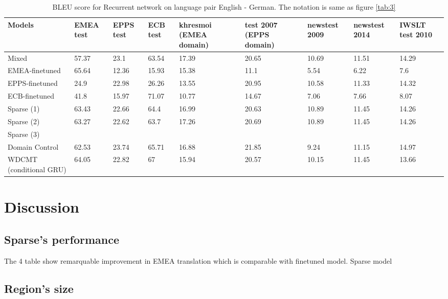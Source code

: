 \documentclass[11pt,a4paper]{article}
\begin{document}
\begin{table}
\begin{center}
 \begin{tabularx}{\textwidth}{|| X | X | X | X | X | X | X | X | X ||} 
 \hline
 Models & EMEA test & EPPS test & ECB test & khresmoi (EMEA domain) & test 2007 (EPPS domain) & newstest 2009 & newstest 2014 & IWSLT test 2010 \\ [0.5ex] 
 \hline\hline
 Mixed & 57.37 & 23.1 & 63.54 & 17.39 & 20.65 & 10.69 & 11.51 & 14.29 \\
 \hline
 EMEA-finetuned & 65.64 & 12.36 & 15.93 & 15.38 & 11.1 & 5.54 & 6.22 & 7.6 \\
 \hline
 EPPS-finetuned & 24.9 & 22.98 & 26.26 & 13.55 & 20.95 & 10.58 & 11.33 & 14.32 \\
 \hline
 ECB-finetuned & 41.8 & 15.97 & 71.07 & 10.77 & 14.67 & 7.06 & 7.66 & 8.07 \\
 \hline
 Sparse (1) & 63.43 & 22.66 & 64.4 & 16.99 & 20.63 & 10.89 & 11.45 & 14.26 \\
 \hline
 Sparse (2) & 63.27 & 22.62 & 63.7 & 17.26 & 20.69 & 10.89 & 11.45 & 14.26 \\
 \hline
 Sparse (3) &  &  &  &  &  &  &  & \\
 \hline
 Domain Control & 62.53 & 23.74 & 65.71 & 16.88 & 21.85 & 9.24 & 11.15 & 14.97 \\
 \hline
 WDCMT (conditional GRU) & 64.05 & 22.82 & 67 & 15.94 & 20.57 & 10.15 & 11.45 & 13.66 \\
 \hline 
\end{tabularx}
\end{center}
\caption{BLEU score for Recurrent network on language pair English - German. The notation is same as figure \ref{tab:3}}
\label{tab:4}
\end{table}

\section{Discussion\label{sec:Discussion}}
\subsection{Sparse's performance}
The 4 table show remarquable improvement in EMEA translation which is comparable with finetuned model. Sparse model 
\subsection{Region's size \label{secc:region_size}}
\end{document}
